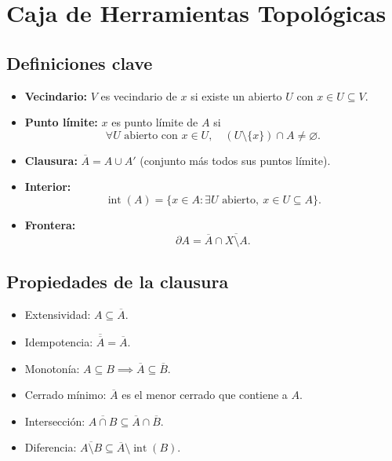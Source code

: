 \documentclass[12pt]{article}
\begin{document}
\section*{Caja de Herramientas Topológicas}

\subsection*{Definiciones clave}
\begin{itemize}
    \item \textbf{Vecindario:} $V$ es vecindario de $x$ si existe un abierto $U$ con $x \in U \subseteq V$.
    \item \textbf{Punto límite:} $x$ es punto límite de $A$ si 
    \[
    \forall U \text{ abierto con } x \in U, \quad (U \setminus \{x\}) \cap A \neq \varnothing.
    \]
    \item \textbf{Clausura:} $\overline{A} = A \cup A'$ (conjunto más todos sus puntos límite).
    \item \textbf{Interior:} 
    \[
    \operatorname{int}(A) = \{x \in A : \exists U \text{ abierto}, \ x \in U \subseteq A\}.
    \]
    \item \textbf{Frontera:} 
    \[
    \partial A = \overline{A} \cap \overline{X \setminus A}.
    \]
\end{itemize}

\subsection*{Propiedades de la clausura}
\begin{itemize}
    \item Extensividad: $A \subseteq \overline{A}$.
    \item Idempotencia: $\overline{\overline{A}} = \overline{A}$.
    \item Monotonía: $A \subseteq B \implies \overline{A} \subseteq \overline{B}$.
    \item Cerrado mínimo: $\overline{A}$ es el menor cerrado que contiene a $A$.
    \item Intersección: $\overline{A \cap B} \subseteq \overline{A} \cap \overline{B}$.
    \item Diferencia: $\overline{A \setminus B} \subseteq \overline{A} \setminus \operatorname{int}(B)$.
\end{itemize}
\end{document}
